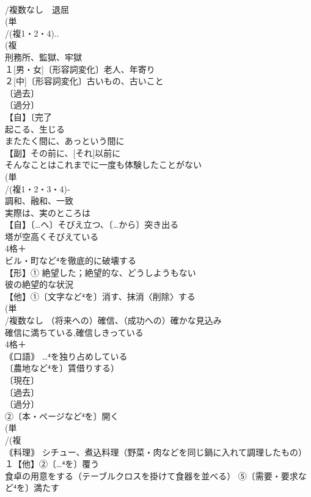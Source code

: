 \documentclass[8pt]{extreport}
\begin{document}
\begin{CJK}{UTF8}{min}
\\	/複数なし　退屈
\\	(単
\\	/(複1・2・4)..
\\	(複
\\	刑務所、監獄、牢獄 
\\	１[男・女]〔形容詞変化〕老人、年寄り 
\\	２[中]〔形容詞変化〕古いもの、古いこと
\\	〔過去〕
\\	〔過分〕
\\	【自】〔完了
\\	起こる、生じる 
\\	またたく間に、あっという間に
\\	【副】その前に、[それ]以前に 
\\	そんなことはこれまでに一度も体験したことがない 
\\	(単
\\	/(複1・2・3・4)‐
\\	調和、融和、一致
\\	実際は、実のところは
\\	【自】〔…へ〕そびえ立つ、〔…から〕突き出る 
\\	塔が空高くそびえている
\\	4格＋
\\	ビル・町など⁴を徹底的に破壊する
\\	【形】① 絶望した；絶望的な、どうしようもない 
\\	彼の絶望的な状況
\\	【他】①〔文字など⁴を〕消す、抹消〈削除〉する
\\	(単
\\	/複数なし （将来への）確信、（成功への）確かな見込み 
\\	確信に満ちている,確信しきっている
\\	4格＋
\\	｟口語｠ …⁴を独り占めしている 
\\	〔農地など⁴を〕賃借りする）
\\	〔現在〕
\\	〔過去〕
\\	〔過分〕
\\	②〔本・ページなど⁴を〕開く
\\	(単
\\	/(複
\\	｟料理｠ シチュー、煮込料理（野菜・肉などを同じ鍋に入れて調理したもの）
\\	１【他】②〔…⁴を〕覆う 
\\	食卓の用意をする（テーブルクロスを掛けて食器を並べる） ⑤〔需要・要求など⁴を〕満たす

\end{CJK}
\end{document}
